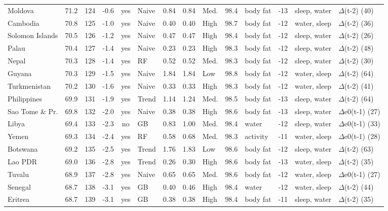 {\begin{longtable}{l r r r c l r r l r l r l l}
Moldova & 71.2 & 124 & -0.6 & yes & Naive & 0.84 & 0.84 & Med. & 98.4 & body fat & -13 & sleep, water & $\Delta$(t-2) (40) \\
Cambodia & 70.8 & 125 & -1.0 & yes & Naive & 0.40 & 0.40 & High & 98.7 & body fat & -12 & water, sleep & $\Delta$(t-2) (36) \\
Solomon Islands & 70.5 & 126 & -1.2 & yes & Naive & 0.47 & 0.47 & High & 98.4 & body fat & -12 & sleep, water & $\Delta$(t-2) (26) \\
Palau & 70.4 & 127 & -1.4 & yes & Naive & 0.23 & 0.23 & High & 98.3 & body fat & -12 & sleep, water & $\Delta$(t-2) (48) \\
Nepal & 70.3 & 128 & -1.4 & yes & RF & 0.52 & 0.52 & Med. & 98.3 & body fat & -12 & sleep, water & $\Delta$(t-2) (30) \\
Guyana & 70.3 & 129 & -1.5 & yes & Naive & 1.84 & 1.84 & Low & 98.8 & body fat & -12 & water, sleep & $\Delta$(t-2) (64) \\
Turkmenistan & 70.2 & 130 & -1.6 & yes & Naive & 0.33 & 0.33 & High & 98.3 & body fat & -12 & water, sleep & $\Delta$(t-2) (41) \\
Philippines & 69.9 & 131 & -1.9 & yes & Trend & 1.14 & 1.24 & Med. & 98.5 & body fat & -13 & sleep, water & $\Delta$(t-2) (64) \\
Sao Tome \& Pr. & 69.8 & 132 & -2.0 & yes & Naive & 0.38 & 0.38 & High & 98.6 & body fat & -13 & sleep, water & $\Delta$e0(t-1) (27) \\
Libya & 69.4 & 133 & -2.3 & no & GB & 0.83 & 1.00 & Med. & 98.4 & water & -12 & sleep, water & $\Delta$e0(t-1) (33) \\
Yemen & 69.3 & 134 & -2.4 & yes & RF & 0.58 & 0.68 & Med. & 98.3 & activity & -11 & water, sleep & $\Delta$e0(t-1) (28) \\
Botswana & 69.2 & 135 & -2.5 & yes & Trend & 1.76 & 1.83 & Low & 98.6 & body fat & -12 & sleep, water & $\Delta$(t-2) (63) \\
Lao PDR & 69.0 & 136 & -2.8 & yes & Trend & 0.26 & 0.30 & High & 98.6 & body fat & -13 & water, sleep & $\Delta$(t-2) (35) \\
Tuvalu & 68.9 & 137 & -2.8 & yes & Naive & 0.65 & 0.65 & Med. & 98.6 & body fat & -12 & water, sleep & $\Delta$e0(t-1) (27) \\
Senegal & 68.7 & 138 & -3.1 & yes & GB & 0.40 & 0.46 & High & 98.4 & water & -12 & water, sleep & $\Delta$(t-2) (44) \\
Eritrea & 68.7 & 139 & -3.1 & yes & GB & 0.38 & 0.38 & High & 98.4 & body fat & -11 & sleep, water & $\Delta$(t-2) (35) \\

\end{longtable}}
